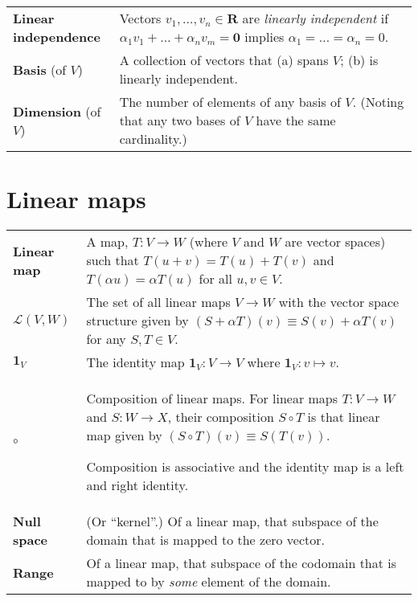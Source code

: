 \documentclass[10pt, a4paper, landscape]{article}
\newcommand{\defn}[1]{\textbf{#1}}
\newcommand{\set}[1]{\mathbold{#1}}
\begin{document}
\begin{multicols*}{3}
\begin{tabularx}{\columnwidth}{@{}l>{\raggedright\arraybackslash}X@{}}
  \parbox[t]{0.8in}{\defn{Linear\\ independence}} & Vectors $v_1, \dots, v_n \in \set{R}$ are \emph{linearly independent} if $\alpha_1 v_1 + \dots + \alpha_n v_m = \set{0}$ implies $\alpha_1 = \dots = \alpha_n=0$. \\

  \defn{Basis} (of $V$) & A collection of vectors that (a) spans $V$; (b) is linearly independent. \\

  \defn{Dimension} (of $V$) & The number of elements of any basis of $V$. (Noting that any two bases of $V$ have the same cardinality.) \\
  
\end{tabularx}



\section*{Linear maps}
\begin{tabularx}{\columnwidth}{@{}l>{\raggedright\arraybackslash}X@{}}
  \toprule

  \defn{Linear map} & A map, $T\colon V\to W$ (where $V$ and $W$ are
  vector spaces) such that $T(u+v) = T(u)+T(v)$ and $T(\alpha u) = \alpha T(u)$
  for all $u,v\in V$. \\

  $\mathcal{L}(V, W)$ & The set of all linear maps $V\to W$ with the vector space structure given by $(S+\alpha T)(v) \equiv S(v)+\alpha T(v)$ for any $S,T\in V$. \\

  $\mathbf{1}_V$ & The identity map $\mathbf{1}_V\colon V\to V$ where $\mathbf{1}_V\colon v\mapsto v$. \\

  $\circ$ & Composition of linear maps. For linear maps $T\colon V\to W$ and $S\colon W\to X$, their composition $S\circ T$ is that linear map given by $(S\circ T)(v) \equiv S(T(v))$.

  Composition is associative and the identity map is a left and right
  identity. \\

  \defn{Null space} & (Or “kernel”.) Of a linear map, that subspace of the domain that is mapped to the zero vector. \\

  \defn{Range} & Of a linear map, that subspace of the codomain that is mapped to by \emph{some} element of the domain.
  
  
\end{tabularx}


\end{multicols*}
\end{document}
